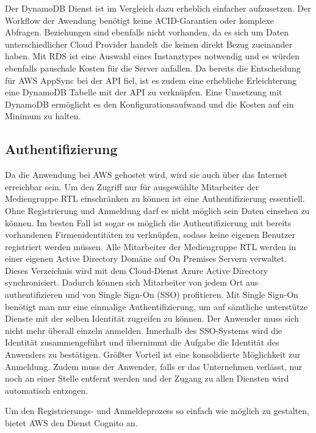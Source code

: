 {Der DynamoDB Dienst ist im Vergleich dazu erheblich einfacher aufzusetzen.
Der Workflow der Awendung benötigt keine ACID-Garantien oder komplexe Abfragen. Beziehungen sind ebenfalls nicht vorhanden, da es sich um Daten unterschiedlicher
Cloud Provider handelt die keinen direkt Bezug zueinander haben.
Mit RDS ist eine Auswahl eines Instanztypes notwendig und es würden ebenfalls pauschale Kosten für die Server anfallen.
Da bereits die Entscheidung für AWS AppSync bei der API fiel, ist es zudem eine erhebliche Erleichterung eine DynamoDB Tabelle mit der API zu verknüpfen.
Eine Umsetzung mit DynamoDB ermöglicht es den Konfigurationsaufwand und die Kosten auf ein Minimum zu halten.


\subsection{Authentifizierung}

Da die Anwendung bei AWS gehostet wird, wird sie auch über das Internet erreichbar sein. Um den Zugriff nur für ausgewählte Mitarbeiter
der Mediengruppe RTL einschränken zu können ist eine Authentifizierung essentiell. Ohne Registrierung und Anmeldung darf es nicht möglich sein
Daten einsehen zu können.
Im besten Fall ist sogar es möglich die Authentifizierung mit bereits vorhandenen Firmenidentitäten zu verknüpfen, sodass keine eigenen
Benutzer registriert werden müssen.
Alle Mitarbeiter der Mediengruppe RTL werden in einer eigenen Active Directory Domäne auf On Premises Servern verwaltet. Dieses Verzeichnis wird mit
dem Cloud-Dienst Azure Active Directory synchronisiert. Dadurch können sich Mitarbeiter von jedem Ort aus authentifizieren und von Single Sign-On (SSO) profitieren.
Mit Single Sign-On benötigt man nur eine einmalige Authentifizierung, um auf sämtliche unterstütze Dienste mit der selben Identität zugreifen zu können.
Der Anwender muss sich nicht mehr überall einzeln anmelden. Innerhalb des SSO-Systems wird die Identität zusammengeführt und übernimmt die Aufgabe
die Identität des Anwenders zu bestätigen. Größter Vorteil ist eine konsolidierte Möglichkeit zur Anmeldung. Zudem muss der Anwender, falls er
das Unternehmen verlässt, nur noch an einer Stelle entfernt werden und der Zugang zu allen Diensten wird automatisch entzogen.

Um den Registrierungs- und Anmeldeprozess so einfach wie möglich zu gestalten, bietet AWS den Dienst Cognito an.

}
